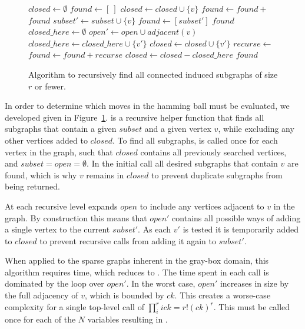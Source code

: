 \begin{figure}
  \begin{algorithmic}[1]
    \State $closed \leftarrow \emptyset$
    \State $found \leftarrow [~]$
      \State $closed \leftarrow closed \cup \{v\}$
      \State $found \leftarrow found + $
    \EndFor
    \State \Return $found$
  \EndProcedure
    \State $subset' \leftarrow subset \cup \{v\}$
    \State $found \leftarrow [subset']$
      \Return $found$
    \EndIf
    \State $closed\_here \leftarrow \emptyset$
    \State $open' \leftarrow open \cup adjacent(v)$
        \State $closed\_here \leftarrow closed\_here \cup \{v'\}$
        \State $closed \leftarrow closed \cup \{v'\}$
        \State $recurse \leftarrow $
        \State $found \leftarrow found + recurse$
    \EndFor
    \State $closed \leftarrow closed - closed\_here$
    \State \Return $found$
  \EndProcedure
\end{algorithmic}
  \caption{Algorithm to recursively find all connected induced subgraphs of size $r$ or fewer.}
  \label{fig-connected-subgraphs}
\end{figure}

In order to determine which moves in the hamming ball must be evaluated,
we developed  given in Figure~\ref{fig-connected-subgraphs}.
 is a recursive helper function that finds all subgraphs
that contain a given $subset$ and a given vertex $v$, while excluding
any other vertices added to $closed$. To find all subgraphs, 
is called once for each vertex in the graph, such that $closed$ contains
all previously searched vertices, and $subset=open=\emptyset$. In the initial
call all desired subgraphs that contain $v$ are found, which is why $v$ remains
in $closed$ to prevent duplicate subgraphs from being returned.

At each recursive level  expands $open$ to include any vertices
adjacent to $v$ in the graph. By construction this means that $open'$ contains
all possible ways of adding a single vertex to the current $subset'$. As each $v'$
is tested it is temporarily added to $closed$ to prevent recursive calls
from adding it again to $subset'$.

When applied to the sparse graphs inherent in the gray-box domain, this algorithm
requires  time, which reduces to . The time spent
in each call is dominated by the loop over $open'$. In the worst case, $open'$
increases in size by the full adjacency of $v$, which is bounded by $ck$.
This creates a worse-case complexity for a single top-level call of
$\prod_{i}^{r} ick = r!(ck)^r$. This must be called once for each
of the $N$ variables resulting in .

